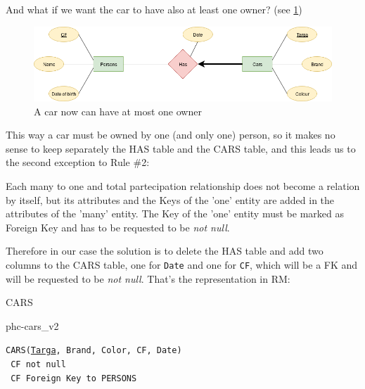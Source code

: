 \documentclass[12pt, oneside]{report}
\newcommand\tab[1][1cm]{\hspace*{#1}}
\begin{document}
\vskip 20pt
And what if we want the car to have also at least one owner? (see \ref{diagram1_02})
\begin{figure}[H]
	\centering
	\includegraphics[width=\textwidth,keepaspectratio]{diagram1_02.png}
	\caption{A car now can have at most one owner}
	\label{diagram1_02}
\end{figure}
This way a car must be owned by one (and only one) person, so it makes no sense to keep separately the HAS table and the CARS table, and this leads us to the second exception to Rule \#2:

Each many to one and total partecipation relationship does not become a relation by itself, but its attributes and the Keys of the 'one' entity are added in the attributes of the 'many' entity. The Key of the 'one' entity must be marked as Foreign Key and has to be requested to be \emph{not null}.

Therefore in our case the solution is to delete the HAS table and add two columns to the CARS table, one for \texttt{Date} and one for \texttt{CF}, which will be a FK and will be requested to be \emph{not null}.
That's the representation in RM:
\vskip 20pt
\noindent \begin{minipage}[c]{0.42\textwidth}
	\begin{center}
		CARS
		\begin{table}[H]
			\centering
			{phc-cars_v2}
		\end{table}
	\end{center}
\end{minipage}
\hspace{.01\textwidth}
\begin{minipage}[c]{0.57\textwidth}
	\texttt{CARS(\underline{Targa}, Brand, Color, CF, Date)}\\
	\tab[.4cm] \texttt{	CF not null}\\
	\tab[.4cm] \texttt{	CF Foreign Key to PERSONS}
\end{minipage}
\vskip 20pt
\end{document}
